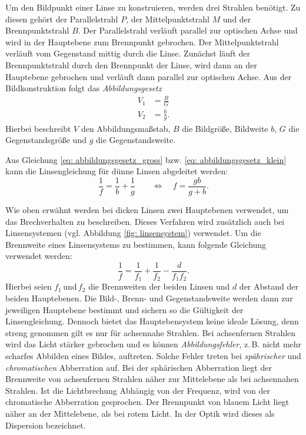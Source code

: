 Um den Bildpunkt einer Linse zu konstruieren, werden drei Strahlen benötigt.
Zu diesen gehört der Parallelstrahl $P$, der Mittelpunktstrahl $M$ und der
Brennpunktstrahl $B$.
Der Parallelstrahl verläuft parallel zur optischen Achse und wird in der Hauptebene
zum Brennpunkt gebrochen. Der Mittelpunktstrahl verläuft vom Gegenstand mittig durch die
Linse. Zunächst läuft der Brennpunktstrahl durch den Brennpunkt der Linse, wird dann
an der Hauptebene gebrochen und verläuft dann parallel zur optischen Achse.
Aus der Bildkonstruktion folgt das \emph{Abbildungsgesetz} %
\begin{align}
  V_1&=\frac{B}{G} \label{eq: abbildungsgesetz_gross} \\
  V_2&=\frac{b}{g} \label{eq: abbildungsgesetz_klein}.
\end{align}
Hierbei beschreibt $V$ den Abbildungsmaßstab, $B$ die Bildgröße, Bildweite $b$, $G$ die Gegenstandsgröße
und $g$ die Gegenstandsweite. %

Aus Gleichung \eqref{eq: abbildungsgesetz_gross} bzw. \eqref{eq: abbildungsgesetz_klein}
kann die Linsengleichung für dünne Linsen abgeleitet werden:
\begin{equation}
  \label{eq: linsengleichung}
  \frac{1}{f}= \frac{1}{b}+  \frac{1}{g} \qquad \Leftrightarrow \quad f= \frac{gb}{g+b}.
\end{equation}

Wie oben erwähnt werden bei dicken Linsen zwei Hauptebenen verwendet, um das Brechverhalten
zu beschreiben. Dieses Verfahren wird zusätzlich auch bei Linsensystemen (vgl. Abbildung \ref{fig: linsensystem}) verwendet. %
Um die Brennweite eines Linsensystems zu bestimmen, kann folgende Gleichung verwendet werden:
\begin{equation}
  \label{eq: gleichung_linsensystem}
  \frac{1}{f}=\frac{1}{f_1}+\frac{1}{f_2}-\frac{d}{f_1f_2}.
\end{equation}
Hierbei seien $f_1 \, \text{und} \, f_2$ die Brennweiten der beiden Linsen und $d$ der
Abstand der beiden Hauptebenen.
Die Bild-, Brenn- und Gegenstandsweite werden dann zur jeweiligen Hauptebene
bestimmt und sichern so die Gültigkeit der Linsengleichung.
Dennoch bietet das Hauptebensystem keine ideale Lösung, denn streng genommen
gilt es nur für achsennahe Strahlen. Bei achsenfernen Strahlen wird das Licht stärker
gebrochen und es können \emph{Abbildungsfehler}, z.\,B. nicht mehr scharfes Abbilden eines Bildes,
auftreten. Solche Fehler treten bei \emph{spährischer} und \emph{chromatischen} Abberration auf.
Bei der sphärischen Abberration liegt der Brennweite von achsenfernen Strahlen näher zur
Mittelebene als bei achsennahen Strahlen.
Ist die Lichtbrechung Abhängig von der Frequenz,
wird von der chromatische Abberration gesprochen.
Der Brennpunkt von blauem Licht liegt näher an der Mittelebene, als %
bei rotem Licht. In der Optik wird dieses als Dispersion bezeichnet.

